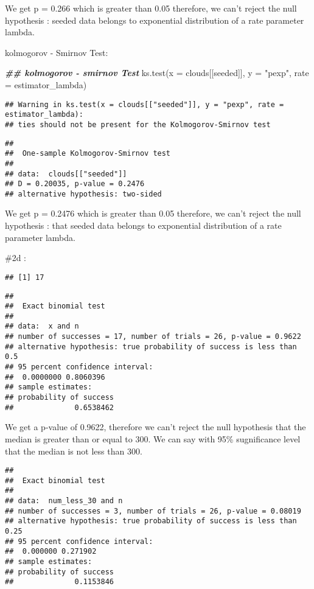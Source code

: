 \documentclass[
]{article}
\newenvironment{Shaded}{\begin{snugshade}}{\end{snugshade}}
\newcommand{\AttributeTok}[1]{\textcolor[rgb]{0.77,0.63,0.00}{#1}}
\newcommand{\DocumentationTok}[1]{\textcolor[rgb]{0.56,0.35,0.01}{\textbf{\textit{#1}}}}
\newcommand{\FunctionTok}[1]{\textcolor[rgb]{0.00,0.00,0.00}{#1}}
\newcommand{\NormalTok}[1]{#1}
\newcommand{\StringTok}[1]{\textcolor[rgb]{0.31,0.60,0.02}{#1}}
\begin{document}
We get p = 0.266 which is greater than 0.05 therefore, we can't reject
the null hypothesis : seeded data belongs to exponential distribution of
a rate parameter lambda.

kolmogorov - Smirnov Test:

\begin{Shaded}
\begin{Highlighting}[]
\DocumentationTok{\#\# kolmogorov {-} smirnov Test}
\FunctionTok{ks.test}\NormalTok{(}\AttributeTok{x =}\NormalTok{ clouds[[}\StringTok{\textquotesingle{}seeded\textquotesingle{}}\NormalTok{]], }\AttributeTok{y =} \StringTok{"pexp"}\NormalTok{, }\AttributeTok{rate =}\NormalTok{ estimator\_lambda)}
\end{Highlighting}
\end{Shaded}

\begin{verbatim}
## Warning in ks.test(x = clouds[["seeded"]], y = "pexp", rate = estimator_lambda):
## ties should not be present for the Kolmogorov-Smirnov test
\end{verbatim}

\begin{verbatim}
## 
##  One-sample Kolmogorov-Smirnov test
## 
## data:  clouds[["seeded"]]
## D = 0.20035, p-value = 0.2476
## alternative hypothesis: two-sided
\end{verbatim}

We get p = 0.2476 which is greater than 0.05 therefore, we can't reject
the null hypothesis : that seeded data belongs to exponential
distribution of a rate parameter lambda.

\#2d :

\begin{verbatim}
## [1] 17
\end{verbatim}

\begin{verbatim}
## 
##  Exact binomial test
## 
## data:  x and n
## number of successes = 17, number of trials = 26, p-value = 0.9622
## alternative hypothesis: true probability of success is less than 0.5
## 95 percent confidence interval:
##  0.0000000 0.8060396
## sample estimates:
## probability of success 
##              0.6538462
\end{verbatim}

We get a p-value of 0.9622, therefore we can't reject the null
hypothesis that the median is greater than or equal to 300. We can say
with 95\% sugnificance level that the median is not less than 300.

\begin{verbatim}
## 
##  Exact binomial test
## 
## data:  num_less_30 and n
## number of successes = 3, number of trials = 26, p-value = 0.08019
## alternative hypothesis: true probability of success is less than 0.25
## 95 percent confidence interval:
##  0.000000 0.271902
## sample estimates:
## probability of success 
##              0.1153846
\end{verbatim}
\end{document}
